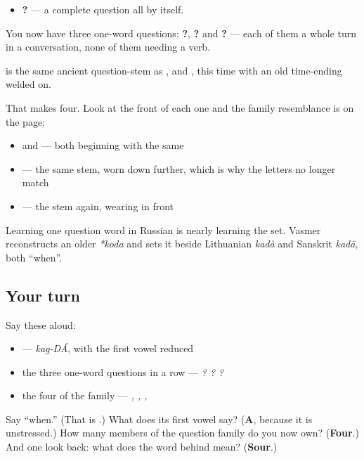 \begin{itemize}
\raggedright
  \item \textbf{?} — a complete question all by itself.
\end{itemize}

You now have three one-word questions: \textbf{?}, \textbf{?} and \textbf{?} — each of them a whole turn in a conversation, none of them needing a verb.

\begin{cousinweb}
\textbf{} is the same ancient question-stem as \textbf{}, \textbf{} and \textbf{}, this time with an old time-ending welded on.

That makes four. Look at the front of each one and the family resemblance is on the page:

\begin{itemize}
\raggedright
  \item \textbf{} and \textbf{} — both beginning with the same \textbf{}
  \item \textbf{} — the same stem, worn down further, which is why the letters no longer match
  \item \textbf{} — the stem again, wearing \textbf{} in front
\end{itemize}

Learning one question word in Russian is nearly learning the set. Vasmer reconstructs an older \emph{*koda} and sets it beside Lithuanian \emph{kadà} and Sanskrit \emph{kadā}, both \textquotedblleft{}when\textquotedblright{}.
\end{cousinweb}

\subsection*{Your turn}
Say these aloud:

\begin{itemize}
\raggedright
  \item \emph{} — \emph{kag-DÁ}, with the first vowel reduced
  \item the three one-word questions in a row — \emph{? ? ?}
  \item the four of the family — \emph{, , , }
\end{itemize}

\begin{tcolorbox}[breakable,colback=teal!4,colframe=teal!35!black,title={Before you move on}]
Say \textquotedblleft{}when.\textquotedblright{} (That is \textbf{}.) What does its first vowel say? (\textbf{A}, because it is unstressed.) How many members of the question family do you now own? (\textbf{Four}.) And one look back: what does the word behind \emph{} mean? (\textbf{Sour}.)
\end{tcolorbox}
